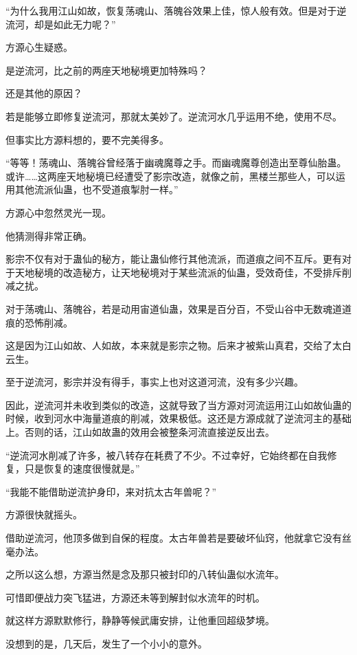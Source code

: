 \begin{this_body}
“为什么我用江山如故，恢复荡魂山、落魄谷效果上佳，惊人般有效。但是对于逆流河，却是如此无力呢？”

方源心生疑惑。

是逆流河，比之前的两座天地秘境更加特殊吗？

还是其他的原因？

若是能够立即修复逆流河，那就太美妙了。逆流河水几乎运用不绝，使用不尽。

但事实比方源料想的，要不完美得多。

“等等！荡魂山、落魄谷曾经落于幽魂魔尊之手。而幽魂魔尊创造出至尊仙胎蛊。或许……这两座天地秘境已经遭受了影宗改造，就像之前，黑楼兰那些人，可以运用其他流派仙蛊，也不受道痕掣肘一样。”

方源心中忽然灵光一现。

他猜测得非常正确。

影宗不仅有对于蛊仙的秘方，能让蛊仙修行其他流派，而道痕之间不互斥。更有对于天地秘境的改造秘方，让天地秘境对于某些流派的仙蛊，受效奇佳，不受排斥削减之扰。

对于荡魂山、落魄谷，若是动用宙道仙蛊，效果是百分百，不受山谷中无数魂道道痕的恐怖削减。

这是因为江山如故、人如故，本来就是影宗之物。后来才被紫山真君，交给了太白云生。

至于逆流河，影宗并没有得手，事实上也对这道河流，没有多少兴趣。

因此，逆流河并未收到类似的改造，这就导致了当方源对河流运用江山如故仙蛊的时候，收到河水中海量道痕的削减，效果极低。这还是方源成就了逆流河主的基础上。否则的话，江山如故蛊的效用会被整条河流直接逆反出去。

“逆流河水削减了许多，被八转存在耗费了不少。不过幸好，它始终都在自我修复，只是恢复的速度很慢就是。”

“我能不能借助逆流护身印，来对抗太古年兽呢？”

方源很快就摇头。

借助逆流河，他顶多做到自保的程度。太古年兽若是要破坏仙窍，他就拿它没有丝毫办法。

之所以这么想，方源当然是念及那只被封印的八转仙蛊似水流年。

可惜即便战力突飞猛进，方源还未等到解封似水流年的时机。

就这样方源默默修行，静静等候武庸安排，让他重回超级梦境。

没想到的是，几天后，发生了一个小小的意外。

\end{this_body}

